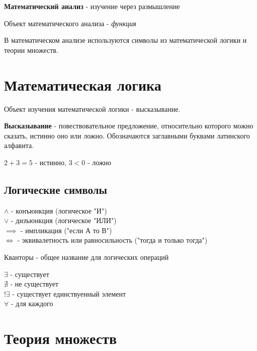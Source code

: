 \textbf{Математический анализ} - изучение через размышление

Объект математического анализа - \textit{функция}

В математическом анализе используются символы из математической логики и теории множеств.

\section{Математическая логика}

Объект изучения математической логики - высказывание.

\begin{definition}
  \textbf{Высказывание} - повествовательное предложение, относительно которого можно сказать, истинно оно или ложно. Обозначаются заглавными буквами латинского алфавита.
\end{definition}
\begin{eg}
  $2+3=5$ - истинно, $3 < 0$ - ложно
\end{eg}

\subsection{Логические символы}

\begin{itemize}
  $\land$ - конъюнкция (логическое "И")\\
  $\lor$ - дизъюнкция (логическое "ИЛИ")\\
  $\implies$ - импликация ("если А то В")\\
  $\iff$ - эквивалетность или равносильность ("тогда и только тогда")\\
\end{itemize}

Кванторы - общее название для логических операций

\begin{itemize}
  $\exists$ - существует\\
  $\nexists$ - не существует\\
  $!\exists$ - существует единствуенный элемент\\
  $\forall$ - для каждого\\
\end{itemize}

\section{Теория множеств}

